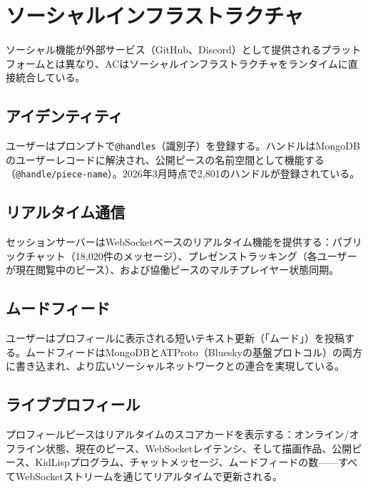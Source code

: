 \documentclass[10pt,letterpaper,twocolumn]{article}
\begin{document}

\section{ソーシャルインフラストラクチャ}
\label{sec:social}

ソーシャル機能が外部サービス（GitHub、Discord）として提供されるプラットフォームとは異なり、ACはソーシャルインフラストラクチャをランタイムに直接統合している。

\subsection{アイデンティティ}

ユーザーはプロンプトで\texttt{@handles}（識別子）を登録する。ハンドルはMongoDBのユーザーレコードに解決され、公開ピースの名前空間として機能する（\texttt{@handle/piece-name}）。2026年3月時点で2,801のハンドルが登録されている。

\subsection{リアルタイム通信}

セッションサーバーはWebSocketベースのリアルタイム機能を提供する：パブリックチャット（18,020件のメッセージ）、プレゼンストラッキング（各ユーザーが現在閲覧中のピース）、および協働ピースのマルチプレイヤー状態同期。

\subsection{ムードフィード}

ユーザーはプロフィールに表示される短いテキスト更新（「ムード」）を投稿する。ムードフィードはMongoDBとATProto（Blueskyの基盤プロトコル）の両方に書き込まれ、より広いソーシャルネットワークとの連合を実現している。

\subsection{ライブプロフィール}

プロフィールピースはリアルタイムのスコアカードを表示する：オンライン/オフライン状態、現在のピース、WebSocketレイテンシ、そして描画作品、公開ピース、KidLispプログラム、チャットメッセージ、ムードフィードの数——すべてWebSocketストリームを通じてリアルタイムで更新される。

\end{document}
